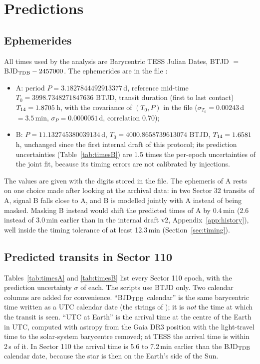 \section{Predictions} \label{sec:predictions}

\subsection{Ephemerides} \label{sec:ephem}

All times used by the analysis are Barycentric TESS Julian Dates, BTJD $=$ BJD$_{\rm TDB} - 2457000$. The ephemerides
are in the file :
\begin{itemize}
\item A: period $P = 3.1827844492913377$\,d, reference mid-time $T_0 = 3998.7348271847636$ BTJD, transit duration (first to
  last contact) $T_{14} = 1.8705$\,h, with the covariance of $(T_0, P)$ in the file ($\sigma_{T_0} = 0.00243$\,d $= 3.5$\,min,
  $\sigma_P = 0.0000051$\,d, correlation 0.70);
\item B: $P = 11.132745380039134$\,d, $T_0 = 4000.8658739613074$ BTJD, $T_{14} = 1.6581$\,h, unchanged since the
  first internal draft of this protocol; its prediction uncertainties (Table~\ref{tab:timesB}) are 1.5 times the
  per-epoch uncertainties of the joint fit, because its timing errors are not calibrated by injections.
\end{itemize}
The values are given with the digits stored in the file. The ephemeris of A rests on one choice made after looking at
the archival data: in two Sector 32 transits of A, signal B falls close to A, and B is modelled jointly with A instead
of being masked. Masking B instead would shift the predicted times of A by 0.4\,min (2.6 instead of 3.0\,min earlier
than in the internal draft v2, Appendix~\ref{app:history}), well inside the timing tolerance of at least 12.3\,min
(Section~\ref{sec:timing}).

\subsection{Predicted transits in Sector 110} \label{sec:times}

Tables~\ref{tab:timesA} and \ref{tab:timesB} list every Sector 110 epoch, with the prediction uncertainty $\sigma$ of
each. The scripts use BTJD only. Two calendar columns are added for convenience. ``BJD$_{\rm TDB}$ calendar'' is the
same barycentric time written as a UTC calendar date (the  strings of
); it is \emph{not} the time at which the transit is seen. ``UTC at Earth'' is the arrival
time at the centre of the Earth in UTC, computed with astropy from the Gaia DR3 position 
with the light-travel time to the solar-system barycentre removed; at TESS the arrival time is within 2\,s of it. In
Sector 110 the arrival time is 5.6 to 7.2\,min earlier than the BJD$_{\rm TDB}$ calendar date, because the star is
then on the Earth's side of the Sun.

